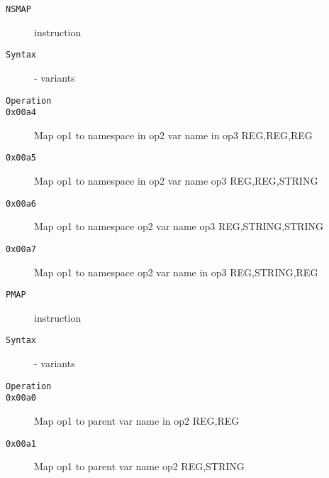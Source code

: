 \begin{description}
\item[\texttt{NSMAP}] instruction\\
\item[\texttt{Syntax}] - variants\\

\item[\texttt{Operation}]
\item[\texttt{}]
\item[\texttt{0x00a4}] Map op1 to namespace in op2 var name in op3  {REG,REG,REG}       \\
\item[\texttt{0x00a5}] Map op1 to namespace in op2 var name op3  {REG,REG,STRING}    \\
\item[\texttt{0x00a6}] Map op1 to namespace op2 var name op3  {REG,STRING,STRING} \\
\item[\texttt{0x00a7}] Map op1 to namespace op2 var name in op3  {REG,STRING,REG}    \\
\end{description}
\clearpage
\begin{description}
\item[\texttt{PMAP}] instruction\\
\item[\texttt{Syntax}] - variants\\

\item[\texttt{Operation}]
\item[\texttt{}]
\item[\texttt{0x00a0}] Map op1 to parent var name in op2  {REG,REG}           \\
\item[\texttt{0x00a1}] Map op1 to parent var name op2  {REG,STRING}        \\
\end{description}
